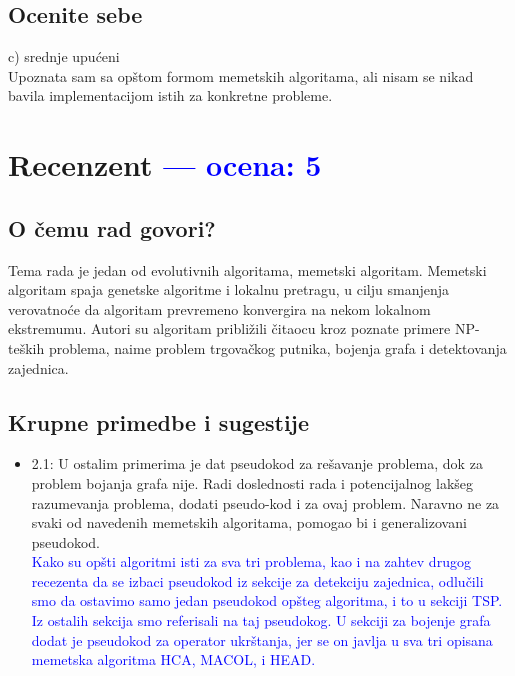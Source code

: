\documentclass[a4paper]{report}
\newcommand{\odgovor}[1]{\textcolor{blue}{#1}}
\begin{document}
\section{Ocenite sebe}
 c) srednje upućeni \\
 Upoznata sam sa opštom formom memetskih algoritama, ali nisam se nikad bavila implementacijom istih za konkretne probleme.


\chapter{Recenzent \odgovor{--- ocena: 5} }


\section{O čemu rad govori?}
Tema rada je jedan od evolutivnih algoritama, memetski algoritam. Memetski algoritam spaja genetske algoritme i lokalnu pretragu, u cilju smanjenja verovatnoće da algoritam prevremeno konvergira na nekom lokalnom ekstremumu.  Autori su algoritam približili čitaocu kroz poznate primere NP-teških problema, naime problem trgovačkog putnika, bojenja grafa i detektovanja zajednica.

\section{Krupne primedbe i sugestije}
\begin{itemize}
    \item 2.1: U ostalim primerima je dat pseudokod za rešavanje problema, dok za problem bojanja grafa nije. Radi doslednosti rada i potencijalnog lakšeg razumevanja problema, dodati pseudo-kod i za ovaj problem. Naravno ne za svaki od navedenih memetskih algoritama, pomogao bi i generalizovani pseudokod.\\
  \odgovor{Kako su opšti algoritmi isti za sva tri problema, kao i na zahtev drugog recezenta da se izbaci pseudokod iz sekcije za detekciju zajednica, odlučili smo da ostavimo samo jedan pseudokod opšteg algoritma, i to u sekciji TSP. Iz ostalih sekcija smo referisali na taj pseudokog. U sekciji za bojenje grafa dodat je pseudokod za operator ukrštanja, jer se on javlja u sva tri opisana memetska algoritma HCA, MACOL, i HEAD.}
\end{itemize}
\end{document}

